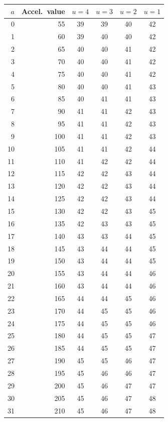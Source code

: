 \documentclass[11pt]{article}
\theoremstyle{remark}
\begin{document}
\begin{table}[H]
\centering
\footnotesize
\setlength{\tabcolsep}{5pt}
\renewcommand{\arraystretch}{0.92}
\begin{tabular}{@{}rr cccc@{}}
\toprule
$a$ & Accel.\ value & $u=4$ & $u=3$ & $u=2$ & $u=1$ \\
\midrule
0  & 55  & 39 & 39 & 40 & 42 \\
1  & 60  & 39 & 40 & 40 & 42 \\
2  & 65  & 40 & 40 & 41 & 42 \\
3  & 70  & 40 & 40 & 41 & 42 \\
4  & 75  & 40 & 40 & 41 & 42 \\
5  & 80  & 40 & 40 & 41 & 43 \\
6  & 85  & 40 & 41 & 41 & 43 \\
7  & 90  & 41 & 41 & 42 & 43 \\
8  & 95  & 41 & 41 & 42 & 43 \\
9  & 100 & 41 & 41 & 42 & 43 \\
10 & 105 & 41 & 41 & 42 & 44 \\
11 & 110 & 41 & 42 & 42 & 44 \\
12 & 115 & 42 & 42 & 43 & 44 \\
13 & 120 & 42 & 42 & 43 & 44 \\
14 & 125 & 42 & 42 & 43 & 44 \\
15 & 130 & 42 & 42 & 43 & 45 \\
16 & 135 & 42 & 43 & 43 & 45 \\
17 & 140 & 43 & 43 & 44 & 45 \\
18 & 145 & 43 & 44 & 44 & 45 \\
19 & 150 & 43 & 44 & 44 & 45 \\
20 & 155 & 43 & 44 & 44 & 46 \\
21 & 160 & 43 & 44 & 44 & 46 \\
22 & 165 & 44 & 44 & 45 & 46 \\
23 & 170 & 44 & 45 & 45 & 46 \\
24 & 175 & 44 & 45 & 45 & 46 \\
25 & 180 & 44 & 45 & 45 & 47 \\
26 & 185 & 44 & 45 & 45 & 47 \\
27 & 190 & 45 & 45 & 46 & 47 \\
28 & 195 & 45 & 46 & 46 & 47 \\
29 & 200 & 45 & 46 & 47 & 47 \\
30 & 205 & 45 & 46 & 47 & 48 \\
31 & 210 & 45 & 46 & 47 & 48 \\

\end{tabular}
\end{table}
\end{document}
